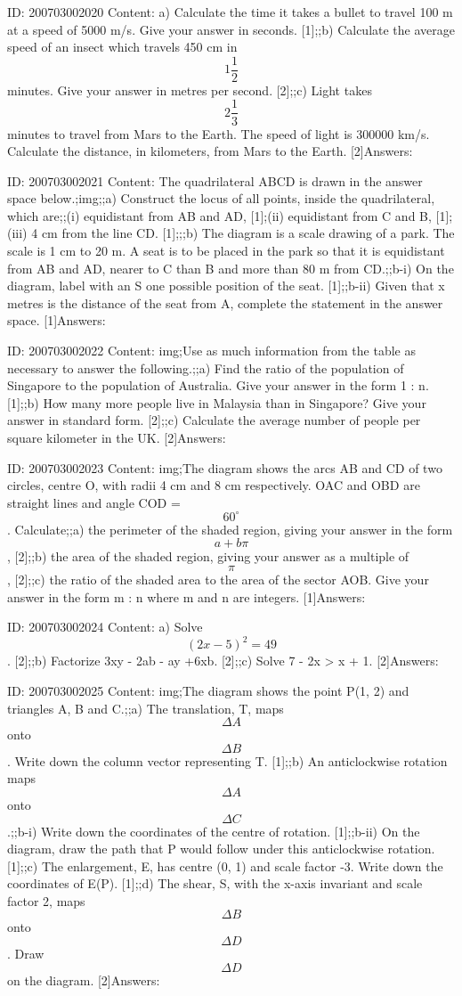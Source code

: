 \documentclass{article}
\begin{document}
ID: 200703002020
Content:
a) Calculate the time it takes a bullet to travel 100 m at a speed of 5000 m/s. Give your answer in seconds. [1];;b) Calculate the average speed of an insect which travels 450 cm in $$1\frac{1}{2}$$ minutes. Give your answer in metres per second. [2];;c) Light takes $$2\frac{1}{3}$$ minutes to travel from Mars to the Earth. The speed of light is 300000 km/s. Calculate the distance, in kilometers, from Mars to the Earth. [2]Answers:

ID: 200703002021
Content:
The quadrilateral ABCD is drawn in the answer space below.;img;;a) Construct the locus of all points, inside the quadrilateral, which are;;(i)	equidistant from AB and AD, [1];(ii) equidistant from C and B, [1];(iii) 4 cm from the line CD. [1];;;b) The diagram is a scale drawing of a park. The scale is 1 cm to 20 m. A seat is to be placed in the park so that it is equidistant from AB and AD, nearer to C than B and more than 80 m from CD.;;b-i) On the diagram, label with an S one possible position of the seat. [1];;b-ii) Given that x metres is the distance of the seat from A, complete the statement in the answer space. [1]Answers:

ID: 200703002022
Content:
img;Use as much information from the table as necessary to answer the following.;;a) Find the ratio of the population of Singapore to the population of Australia. Give your answer in the form 1 : n. [1];;b) How many more people live in Malaysia than in Singapore? Give your answer in standard form. [2];;c) Calculate the average number of people per square kilometer in the UK. [2]Answers:

ID: 200703002023
Content:
img;The diagram shows the arcs AB and CD of two circles, centre O, with radii 4 cm and 8 cm respectively. OAC and OBD are straight lines and angle COD = $$60^{\circ}$$. Calculate;;a) the perimeter of the shaded region, giving your answer in the form $$a+b\pi$$, [2];;b) the area of the shaded region, giving your answer as a multiple of $$\pi$$, [2];;c) the ratio of the shaded area to the area of the sector AOB. Give your answer in the form m : n where m and n are integers. [1]Answers:

ID: 200703002024
Content:
a) Solve $$(2x-5)^{2} =49$$. [2];;b) Factorize 3xy - 2ab - ay +6xb. [2];;c) Solve 7 - 2x > x + 1. [2]Answers:

ID: 200703002025
Content:
img;The diagram shows the point P(1, 2) and triangles A, B and C.;;a) The translation, T, maps $$\Delta  A$$ onto $$\Delta  B$$. Write down the column vector representing T. [1];;b) An anticlockwise rotation maps $$\Delta  A$$ onto $$\Delta  C$$.;;b-i) Write down the coordinates of the centre of rotation. [1];;b-ii) On the diagram, draw the path that P would follow under this anticlockwise rotation. [1];;c) The enlargement, E, has centre (0, 1) and scale factor -3. Write down the coordinates of E(P). [1];;d) The shear, S, with the x-axis invariant and scale factor 2, maps $$\Delta  B$$ onto $$\Delta  D$$. Draw $$\Delta  D$$ on the diagram. [2]Answers:
\end{document}
